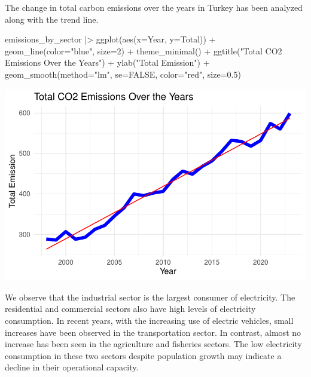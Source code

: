 \documentclass[
  letterpaper,
  DIV=11,
  numbers=noendperiod]{scrartcl}
\newenvironment{Shaded}{\begin{snugshade}}{\end{snugshade}}
\newcommand{\AttributeTok}[1]{\textcolor[rgb]{0.40,0.45,0.13}{#1}}
\newcommand{\ConstantTok}[1]{\textcolor[rgb]{0.56,0.35,0.01}{#1}}
\newcommand{\DecValTok}[1]{\textcolor[rgb]{0.68,0.00,0.00}{#1}}
\newcommand{\FloatTok}[1]{\textcolor[rgb]{0.68,0.00,0.00}{#1}}
\newcommand{\FunctionTok}[1]{\textcolor[rgb]{0.28,0.35,0.67}{#1}}
\newcommand{\NormalTok}[1]{\textcolor[rgb]{0.00,0.23,0.31}{#1}}
\newcommand{\SpecialCharTok}[1]{\textcolor[rgb]{0.37,0.37,0.37}{#1}}
\newcommand{\StringTok}[1]{\textcolor[rgb]{0.13,0.47,0.30}{#1}}
\begin{document}
The change in total carbon emissions over the years in Turkey has been
analyzed along with the trend line.

\begin{Shaded}
\begin{Highlighting}[]
\NormalTok{emissions\_by\_sector }\SpecialCharTok{|\textgreater{}} \FunctionTok{ggplot}\NormalTok{(}\FunctionTok{aes}\NormalTok{(}\AttributeTok{x=}\NormalTok{Year, }\AttributeTok{y=}\NormalTok{Total)) }\SpecialCharTok{+} \FunctionTok{geom\_line}\NormalTok{(}\AttributeTok{color=}\StringTok{"blue"}\NormalTok{, }\AttributeTok{size=}\DecValTok{2}\NormalTok{) }\SpecialCharTok{+} \FunctionTok{theme\_minimal}\NormalTok{() }\SpecialCharTok{+} \FunctionTok{ggtitle}\NormalTok{(}\StringTok{"Total CO2 Emissions Over the Years"}\NormalTok{) }\SpecialCharTok{+} \FunctionTok{ylab}\NormalTok{(}\StringTok{"Total Emission"}\NormalTok{) }\SpecialCharTok{+} \FunctionTok{geom\_smooth}\NormalTok{(}\AttributeTok{method=}\StringTok{"lm"}\NormalTok{, }\AttributeTok{se=}\ConstantTok{FALSE}\NormalTok{, }\AttributeTok{color=}\StringTok{"red"}\NormalTok{, }\AttributeTok{size=}\FloatTok{0.5}\NormalTok{)}
\end{Highlighting}
\end{Shaded}

\includegraphics{project_files/figure-pdf/unnamed-chunk-17-1.pdf}

We observe that the industrial sector is the largest consumer of
electricity. The residential and commercial sectors also have high
levels of electricity consumption. In recent years, with the increasing
use of electric vehicles, small increases have been observed in the
transportation sector. In contrast, almost no increase has been seen in
the agriculture and fisheries sectors. The low electricity consumption
in these two sectors despite population growth may indicate a decline in
their operational capacity.
\end{document}
